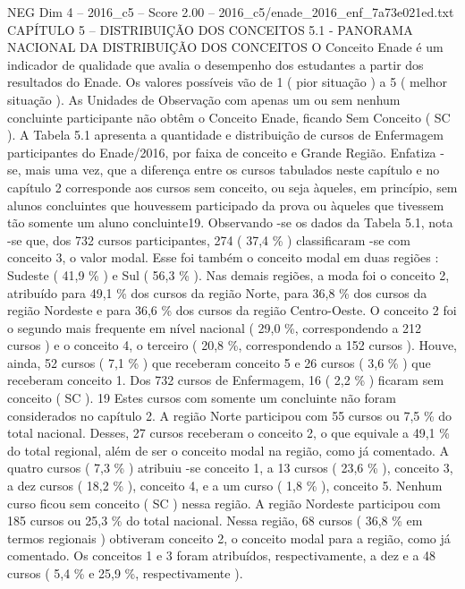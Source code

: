 \begin{textsample}{NEG Dim 4 – 2016\_c5 – Score 2.00 – 2016\_c5/enade\_2016\_enf\_7a73e021ed.txt}  \label{ex:f4_neg_258}
CAPÍTULO 5 – DISTRIBUIÇÃO DOS CONCEITOS 5.1 - PANORAMA NACIONAL DA DISTRIBUIÇÃO DOS CONCEITOS O Conceito Enade é um indicador de qualidade que avalia o desempenho dos estudantes a partir dos resultados do Enade.
Os valores possíveis vão de 1 ( pior situação ) a 5 ( melhor situação ).
As Unidades de Observação com apenas um ou sem nenhum concluinte participante não obtêm o Conceito Enade, ficando Sem Conceito ( SC ).
A Tabela 5.1 apresenta a quantidade e distribuição de cursos de Enfermagem participantes do Enade/2016, por faixa de conceito e Grande Região.
Enfatiza -se, mais uma vez, que a diferença entre os cursos tabulados neste capítulo e no capítulo 2 corresponde aos cursos sem conceito, ou seja àqueles, em princípio, sem alunos concluintes que houvessem participado da prova ou àqueles que tivessem tão somente um aluno concluinte19.
Observando -se os dados da Tabela 5.1, nota -se que, dos 732 cursos participantes, 274 ( 37,4 \% ) classificaram -se com conceito 3, o valor modal.
Esse foi também o conceito modal em duas regiões : Sudeste ( 41,9 \% ) e Sul ( 56,3 \% ).
Nas demais regiões, a moda foi o conceito 2, atribuído para 49,1 \% dos cursos da região Norte, para 36,8 \% dos cursos da região Nordeste e para 36,6 \% dos cursos da região Centro-Oeste.
O conceito 2 foi o segundo mais frequente em nível nacional ( 29,0 \%, correspondendo a 212 cursos ) e o conceito 4, o terceiro ( 20,8 \%, correspondendo a 152 cursos ).
Houve, ainda, 52 cursos ( 7,1 \% ) que receberam conceito 5 e 26 cursos ( 3,6 \% ) que receberam conceito 1.
Dos 732 cursos de Enfermagem, 16 ( 2,2 \% ) ficaram sem conceito ( SC ). 19 Estes cursos com somente um concluinte não foram considerados no capítulo 2.
A região Norte participou com 55 cursos ou 7,5 \% do total nacional.
Desses, 27 cursos receberam o conceito 2, o que equivale a 49,1 \% do total regional, além de ser o conceito modal na região, como já comentado.
A quatro cursos ( 7,3 \% ) atribuiu -se conceito 1, a 13 cursos ( 23,6 \% ), conceito 3, a dez cursos ( 18,2 \% ), conceito 4, e a um curso ( 1,8 \% ), conceito 5.
Nenhum curso ficou sem conceito ( SC ) nessa região.
A região Nordeste participou com 185 cursos ou 25,3 \% do total nacional.
Nessa região, 68 cursos ( 36,8 \% em termos regionais ) obtiveram conceito 2, o conceito modal para a região, como já comentado.
Os conceitos 1 e 3 foram atribuídos, respectivamente, a dez e a 48 cursos ( 5,4 \% e 25,9 \%, respectivamente ).

\end{textsample}
